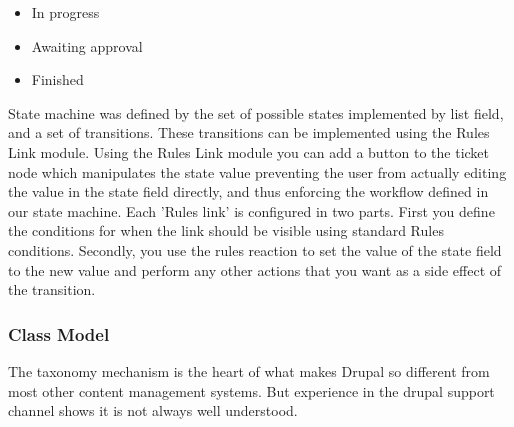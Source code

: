 \begin{itemize}
\item In progress
\item Awaiting approval
\item Finished
\end{itemize}

State machine was defined by the set of possible states implemented by list field, and a set of transitions. These transitions can be implemented using the Rules Link module. Using the Rules Link module you can add a button to the ticket node which manipulates the state value preventing the user from actually editing the value in the state field directly, and thus enforcing the workflow defined in our state machine. Each 'Rules link' is configured in two parts. First you define the conditions for when the link should be visible using standard Rules conditions. Secondly, you use the rules reaction to set the value of the state field to the new value and perform any other actions that you want as a side effect of the transition.

\subsubsection{Class Model}

The taxonomy mechanism is the heart of what makes Drupal so different from most other content management systems. But experience in the drupal support channel shows it is not always well understood.

